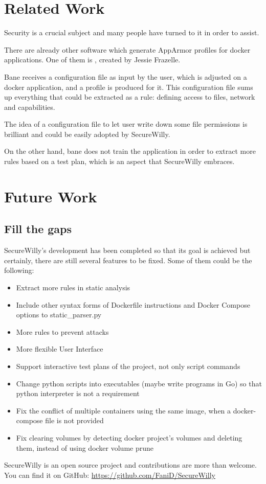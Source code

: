 \section{Related Work}

Security is a crucial subject and many people have turned to it in order to assist.

There are already other software which generate AppArmor profiles for docker applications. One of them is , created by Jessie Frazelle. \cite{bane}

Bane receives a configuration file as input by the user, which is adjusted on a docker application, and a profile is produced for it. This configuration file sums up everything that could be extracted as a rule: defining access to files, network and capabilities.

The idea of a configuration file to let user write down some file permissions is brilliant and could be easily adopted by SecureWilly.

On the other hand, bane does not train the application in order to extract more rules based on a test plan, which is an aspect that SecureWilly embraces.

\section{Future Work}

\subsection{Fill the gaps}
SecureWilly's development has been completed so that its goal is achieved but certainly, there are still several features to be fixed. Some of them could be the following:
\begin{itemize}
\item Extract more rules in static analysis
\item Include other syntax forms of Dockerfile instructions and Docker Compose options to static\_parser.py
\item More rules to prevent attacks
\item More flexible User Interface
\item Support interactive test plans of the project, not only script commands
\item Change python scripts into executables (maybe write programs in Go) so that python interpreter is not a requirement
\item Fix the conflict of multiple containers using the same image, when a docker-compose file is not provided
\item Fix clearing volumes by detecting docker project's volumes and deleting them, instead of using docker volume prune
\end{itemize}
SecureWilly is an open source project and contributions are more than welcome. You can find it on GitHub: \url{https://github.com/FaniD/SecureWilly}

